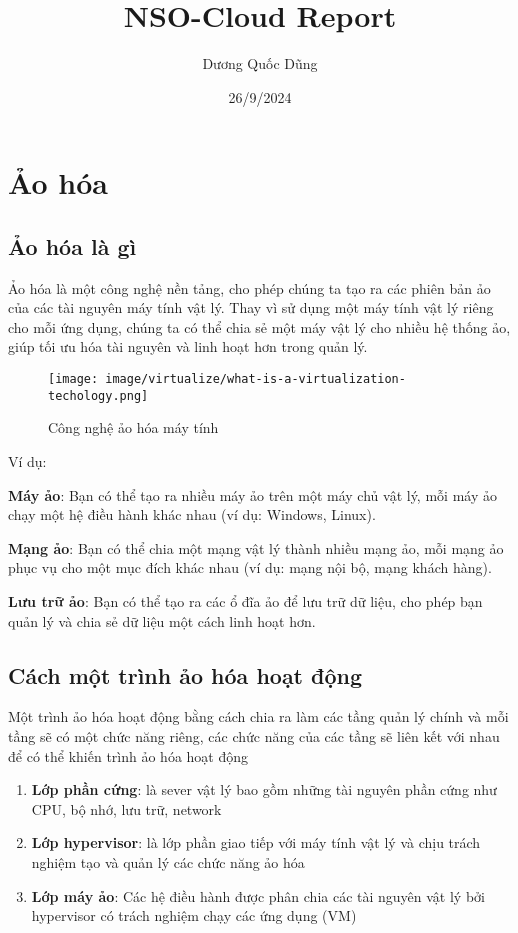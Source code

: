 \documentclass[a4paper,12pt]{article}
\title{NSO-Cloud Report}
\author{Dương Quốc Dũng}
\date{26/9/2024}
\begin{document}
\maketitle

\tableofcontents

\section{Ảo hóa}
\subsection{ Ảo hóa là gì}
Ảo hóa là một công nghệ nền tảng, cho phép chúng ta tạo ra các phiên bản ảo của các tài nguyên máy tính vật lý. Thay vì sử dụng một máy tính vật lý riêng cho mỗi ứng dụng, chúng ta có thể chia sẻ một máy vật lý cho nhiều hệ thống ảo, giúp tối ưu hóa tài nguyên và linh hoạt hơn trong quản lý.


\begin{figure}[h]
    \centering
    \texttt{[image: image/virtualize/what-is-a-virtualization-techology.png]}
    \caption{Công nghệ ảo hóa máy tính}
    \label{}
\end{figure}





Ví dụ:

\textbf{Máy ảo}: Bạn có thể tạo ra nhiều máy ảo trên một máy chủ vật lý, mỗi máy ảo chạy một hệ điều hành khác nhau (ví dụ: Windows, Linux).

\textbf{Mạng ảo}: Bạn có thể chia một mạng vật lý thành nhiều mạng ảo, mỗi mạng ảo phục vụ cho một mục đích khác nhau (ví dụ: mạng nội bộ, mạng khách hàng).

\textbf{Lưu trữ ảo}: Bạn có thể tạo ra các ổ đĩa ảo để lưu trữ dữ liệu, cho phép bạn quản lý và chia sẻ dữ liệu một cách linh hoạt hơn.


\subsection{ Cách một trình ảo hóa hoạt động}
Một trình ảo hóa hoạt động bằng cách chia ra làm các tầng quản lý chính và mỗi tầng sẽ có một chức năng riêng, các chức năng của các tầng sẽ liên kết với nhau để có thể khiến trình ảo hóa hoạt động 

\begin{enumerate}
    \item \textbf{Lớp phần cứng}: là sever vật lý bao gồm những tài nguyên phần cứng như CPU, bộ nhớ, lưu trữ, network
    \item \textbf{Lớp hypervisor}: là lớp phần giao tiếp với máy tính vật lý và chịu trách nghiệm tạo và quản lý các chức năng ảo hóa
    \item \textbf{Lớp máy ảo}: Các hệ điều hành được phân chia các tài nguyên vật lý bởi hypervisor có trách nghiệm chạy các ứng dụng (VM) 
\end{enumerate}
\end{document}

